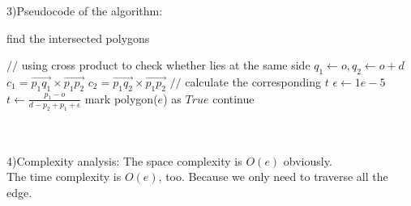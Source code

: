 \documentclass[]{article}
\begin{document}
\begin{enumerate}
	3)Pseudocode of the algorithm:
	 \begin{algorithm} 
		\caption{find the intersected polygons}
		\begin{algorithmic}[1]
			\STATE $//$ using cross product to check whether lies at the same side
			\STATE $q_1\leftarrow o, q_2\leftarrow o+d$
			\STATE $c_1 = \vec{p_1q_1} \times \vec{p_1p_2}$
			\STATE $c_2 = \vec{p_1q_2} \times \vec{p_1p_2}$
			\ENDIF
			\STATE $//$ calculate the corresponding $t$
			\STATE $\epsilon \leftarrow 1e-5$
			\STATE $t \leftarrow \frac{p_1-o}{d-p_2+p_1+\epsilon}$
			\STATE mark polygon($e$) as $True$
			\ENDIF
			\STATE continue
			\ENDFOR
		\end{algorithmic}
	\end{algorithm}
	\\
	\vspace{1cm}
	\\
	4)Complexity analysis:
	The space complexity is $O(e)$ obviously.\\
	The time complexity is $O(e)$, too. Because we only need to traverse all the edge.
\end{enumerate}
\end{document}
